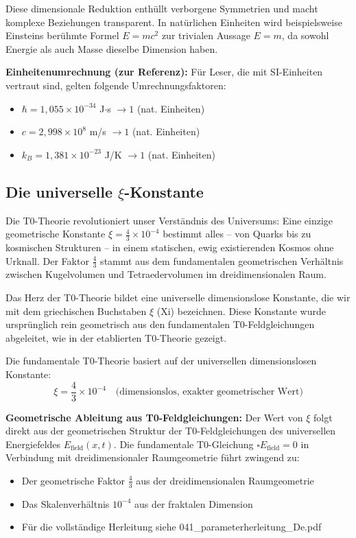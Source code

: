 	Diese dimensionale Reduktion enthüllt verborgene Symmetrien und macht komplexe Beziehungen transparent. In natürlichen Einheiten wird beispielsweise Einsteins berühmte Formel $E = mc^2$ zur trivialen Aussage $E = m$, da sowohl Energie als auch Masse dieselbe Dimension haben.
	
	\textbf{Einheitenumrechnung (zur Referenz):}
	Für Leser, die mit SI-Einheiten vertraut sind, gelten folgende Umrechnungsfaktoren:
	\begin{itemize}
		\item $\hbar = 1{,}055 \times 10^{-34}$ J$\cdot$s $\rightarrow 1$ (nat. Einheiten)
		\item $c = 2{,}998 \times 10^8$ m/s $\rightarrow 1$ (nat. Einheiten)  
		\item $k_B = 1{,}381 \times 10^{-23}$ J/K $\rightarrow 1$ (nat. Einheiten)
	\end{itemize}
	
	\subsection{Die universelle $\xi$-Konstante}
	
	\begin{revolutionary}
		Die T0-Theorie revolutioniert unser Verständnis des Universums: Eine einzige geometrische Konstante $\xi = \frac{4}{3} \times 10^{-4}$ bestimmt alles -- von Quarks bis zu kosmischen Strukturen -- in einem statischen, ewig existierenden Kosmos ohne Urknall. Der Faktor $\frac{4}{3}$ stammt aus dem fundamentalen geometrischen Verhältnis zwischen Kugelvolumen und Tetraedervolumen im dreidimensionalen Raum.
	\end{revolutionary}
	
	Das Herz der T0-Theorie bildet eine universelle dimensionslose Konstante, die wir mit dem griechischen Buchstaben $\xi$ (Xi) bezeichnen. Diese Konstante wurde ursprünglich rein geometrisch aus den fundamentalen T0-Feldgleichungen abgeleitet, wie in der etablierten T0-Theorie \cite{T0Theory} gezeigt.
	
	Die fundamentale T0-Theorie basiert auf der universellen dimensionslosen Konstante:
	\begin{equation}
		\xi = \frac{4}{3} \times 10^{-4} \quad \text{(dimensionslos, exakter geometrischer Wert)}
	\end{equation}
	
	\textbf{Geometrische Ableitung aus T0-Feldgleichungen:} Der Wert von $\xi$ folgt direkt aus der geometrischen Struktur der T0-Feldgleichungen des universellen Energiefeldes $E_{\text{field}}(x,t)$. Die fundamentale T0-Gleichung $\square E_{\text{field}} = 0$ in Verbindung mit dreidimensionaler Raumgeometrie führt zwingend zu:
\begin{itemize}
	\item Der geometrische Faktor $\frac{4}{3}$ aus der dreidimensionalen Raumgeometrie
	\item Das Skalenverhältnis $10^{-4}$ aus der fraktalen Dimension
	\item Für die vollständige Herleitung siehe 041\_parameterherleitung\_De.pdf 
\end{itemize}
	
